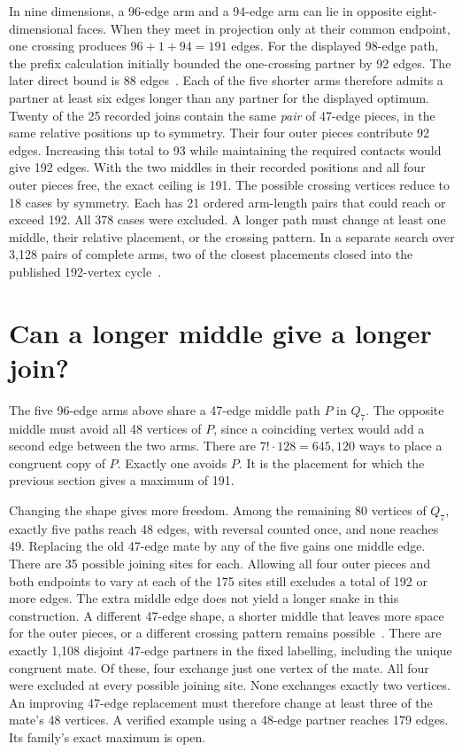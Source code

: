 \documentclass[11pt,a4paper]{article}
\begin{document}
In nine dimensions, a 96-edge arm and a 94-edge arm can lie in
opposite eight-dimensional faces. When they meet in projection only at
their common endpoint, one crossing produces $96+1+94=191$ edges.
For the displayed 98-edge path, the prefix calculation initially
bounded the one-crossing partner by 92 edges. The later direct
bound is 88 edges~\cite{long249}. Each of the five shorter arms
therefore admits a partner at least six edges longer than any
partner for the displayed optimum.
Twenty of the 25 recorded joins contain the same \emph{pair} of
47-edge pieces, in the same relative positions up to symmetry. Their
four outer pieces contribute 92 edges. Increasing this total to 93
while maintaining the required contacts would give 192 edges.
With the two middles in their recorded positions and all four outer
pieces free, the exact ceiling is 191. The possible crossing vertices
reduce to 18 cases by symmetry. Each has 21 ordered arm-length pairs
that could reach or exceed 192. All 378 cases were excluded. A longer
path must change at least one middle, their relative placement, or the
crossing pattern. In a separate search over 3,128 pairs of complete
arms, two of the closest placements closed into the published
192-vertex cycle~\cite{q8parents246}.

\section{Can a longer middle give a longer join?}

The five 96-edge arms above share a 47-edge middle path \(P\) in
\(Q_7\). The opposite middle must avoid all 48 vertices of \(P\),
since a coinciding vertex would add a second edge between the two arms.
There are \(7!\cdot128=645{,}120\) ways to place a congruent copy of
\(P\). Exactly one avoids \(P\). It is the placement for which the
previous section gives a maximum of 191.

Changing the shape gives more freedom. Among the remaining 80 vertices
of \(Q_7\), exactly five paths reach 48 edges, with reversal counted
once, and none reaches 49. Replacing the old 47-edge mate by any of
the five gains one middle edge. There are 35 possible joining sites
for each. Allowing
all four outer pieces and both endpoints to vary at each of the 175 sites
still excludes a total of 192 or more edges. The extra middle edge does
not yield a longer snake in this construction. A different 47-edge
shape, a shorter middle that leaves more space for the outer pieces,
or a different crossing pattern remains possible~\cite{middle247}.
There are exactly 1,108 disjoint 47-edge partners in the fixed labelling,
including the unique congruent mate.
Of these, four exchange just one vertex of the mate. All four were
excluded at every possible joining site. None exchanges exactly two
vertices. An improving 47-edge replacement must therefore change at
least three of the mate's 48 vertices. A verified example using a
48-edge partner reaches 179 edges. Its family's exact maximum is open.
\end{document}

